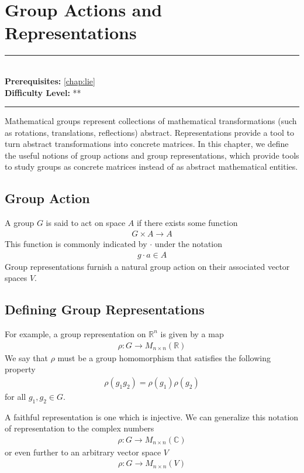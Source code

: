 \documentclass[book.tex]{subfiles}
\begin{document}
\chapter{Group Actions and Representations}

\label{chap:lorentz_group}
\noindent\rule{11cm}{0.4pt} \\
\textbf{Prerequisites:} \autoref{chap:lie} \\
\textbf{Difficulty Level:} ** \\
\noindent\rule{11cm}{0.4pt}
\vspace{5mm}

Mathematical groups represent collections of mathematical transformations (such as rotations, translations, reflections) abstract. Representations provide a tool to turn abstract transformations into concrete matrices. In this chapter, we define the useful notions of group actions and group representations, which provide tools to study groups as concrete matrices instead of as abstract mathematical entities.

\section{Group Action}

A group $G$ is said to act on space $A$ if there exists some function 
\begin{align}
G \times A \to A
\end{align}
This function is commonly indicated by $\cdot$ under the notation
\begin{align}
g \cdot a \in A
\end{align}
Group representations furnish a natural group action on their associated vector spaces $V$.

\section{Defining Group Representations}

For example, a group representation on $\mathbb{R}^n$ is given by a map
\begin{align}
\rho: G \to M_{n\times n}(\mathbb{R})
\end{align}
We say that $\rho$ must be a group homomorphism that satisfies the following property
\begin{align}
    \rho(g_1g_2) = \rho(g_1)\rho(g_2)
\end{align}
for all $g_1, g_2 \in G$.

A faithful representation is one which is injective. We can generalize this notation of representation to the complex numbers
\begin{align}
\rho: G \to M_{n \times n}(\mathbb{C})
\end{align}
or even further to an arbitrary vector space $V$
\begin{align}
\rho: G \to M_{n \times n}(V)
\end{align}
\end{document}
